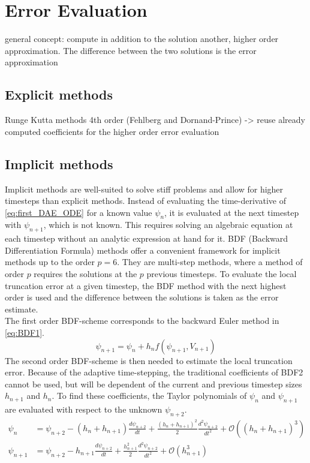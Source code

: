 \section{Error Evaluation}
general concept: compute in addition to the solution another, higher order approximation. The difference between the two solutions is the error approximation
\subsection{Explicit methods}
Runge Kutta methods 4th order (Fehlberg and Dornand-Prince) -> reuse already computed coefficients for the higher order error evaluation
\subsection{Implicit methods}
Implicit methods are well-suited to solve stiff problems and allow for higher timesteps than explicit methods. Instead of evaluating the time-derivative of \autoref{eq:first_DAE_ODE} for a known value $\psi_n$, it is evaluated at the next timestep with $\psi_{n+1}$, which is not known. This requires solving an algebraic equation at each timestep without an analytic expression at hand for it. BDF (Backward Differentiation Formula) methods offer a convenient framework for implicit methods up to the order $p=6$. They are multi-step methods, where a method of order $p$ requires the solutions at the $p$ previous timesteps. To evaluate the local truncation error at a given timestep, the BDF method with the next highest order is used and the difference between the solutions is taken as the error estimate. \\
The first order BDF-scheme corresponds to the backward Euler method in \autoref{eq:BDF1}.
\begin{equation}
    \label{eq:BDF1}
    \psi_{n+1} = \psi_n + h_{n}f(\psi_{n+1},V_{n+1})
\end{equation}
The second order BDF-scheme is then needed to estimate the local truncation error. Because of the adaptive time-stepping, the traditional coefficients of BDF2 cannot be used, but will be dependent of the current and previous timestep sizes $h_{n+1}$ and $h_n$. To find these coefficients, the Taylor polynomials of $\psi_n$ and $\psi_{n+1}$ are evaluated with respect to the unknown $\psi_{n+2}$. 
\begin{align}
    \label{eq:taylor-polynomialBDF1(1)}
    \psi_{n} &= \psi_{n+2} - (h_{n} + h_{n+1})\frac{d\psi_{n+2}}{dt} + \frac{(h_{n} + h_{n+1})^2}{2}\frac{d^2\psi_{n+2}}{dt^2} + \mathcal{O}\left((h_{n} + h_{n+1})^3\right) \\
    \label{eq:taylor-polynomialBDF1(2)}
    \psi_{n+1} &= \psi_{n+2} - h_{n+1}\frac{d\psi_{n+2}}{dt} + \frac{h_{n+1}^2}{2}\frac{d^2\psi_{n+2}}{dt^2} + \mathcal{O}\left(h_{n+1}^3\right)
\end{align}

